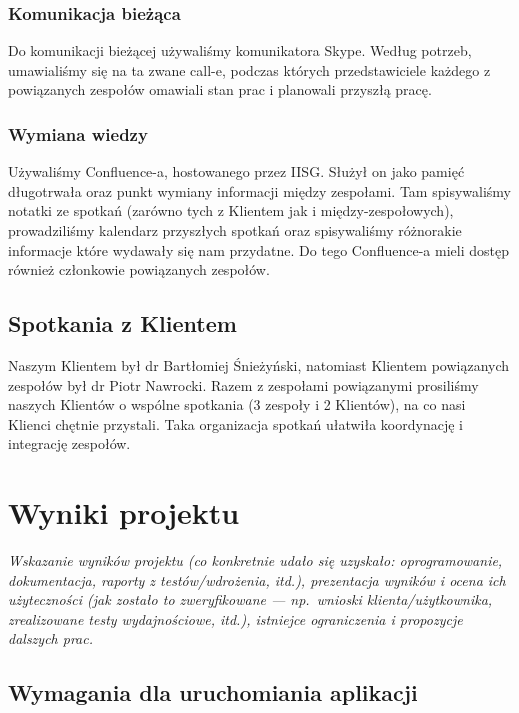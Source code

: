 \documentclass[polish,12pt]{aghthesis}
\begin{document}
\subsubsection{Komunikacja bieżąca}
Do komunikacji bieżącej używaliśmy komunikatora Skype. Według potrzeb, umawialiśmy się na ta zwane call-e, podczas których przedstawiciele każdego z powiązanych zespołów omawiali stan prac i planowali przyszłą pracę.
\subsubsection{Wymiana wiedzy}
Używaliśmy Confluence-a, hostowanego przez IISG. Służył on jako pamięć długotrwała oraz punkt wymiany informacji między zespołami. Tam spisywaliśmy notatki ze spotkań (zarówno tych z Klientem jak i między-zespołowych), prowadziliśmy kalendarz przyszłych spotkań oraz spisywaliśmy różnorakie informacje które wydawały się nam przydatne. Do tego Confluence-a mieli dostęp również członkowie powiązanych zespołów.

\subsection{Spotkania z Klientem}
Naszym Klientem był dr Bartłomiej Śnieżyński, natomiast Klientem powiązanych zespołów był dr Piotr Nawrocki. Razem z zespołami powiązanymi prosiliśmy naszych Klientów o wspólne spotkania (3 zespoły i 2 Klientów), na co nasi Klienci chętnie przystali. Taka organizacja spotkań ułatwiła koordynację i integrację zespołów.
  



\section{Wyniki projektu}

\label{sec:wyniki-projektu}

\emph{Wskazanie wyników projektu (co konkretnie udało się uzyskało:
  oprogramowanie, dokumentacja, raporty z testów/wdrożenia, itd.), prezentacja wyników
  i ocena ich użyteczności (jak zostało to zweryfikowane --- np.\ wnioski
  klienta/użytkownika, zrealizowane testy wydajnościowe, itd.),
  istniejce ograniczenia i propozycje dalszych prac.}

\subsection{Wymagania dla uruchomiania aplikacji}
\end{document}
